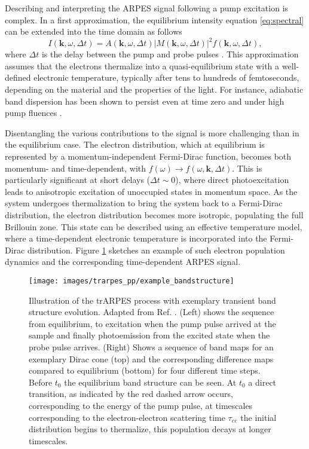 Describing and interpreting the ARPES signal following a pump excitation is complex.
In a first approximation, the equilibrium intensity equation \ref{eq:spectral} can be extended into the time domain as follows
\begin{equation}
	I(\mathbf{k}, \omega, \Delta t) = A(\mathbf{k}, \omega, \Delta t)\left|M(\mathbf{k}, \omega, \Delta t)\right|^2f(\mathbf{k}, \omega, \Delta t),
\end{equation}
where $\Delta t$ is the delay between the pump and probe pulses \cite{freericks_what_2021}.
This approximation assumes that the electrons thermalize into a quasi-equilibrium state with a well-defined electronic temperature, typically after tens to hundreds of femtoseconds, depending on the material and the properties of the light.
For instance, adiabatic band dispersion has been shown to persist even at time zero and under high pump fluences \cite{boschini_time-resolved_2024,neufeld_time-_2022}.

Disentangling the various contributions to the signal is more challenging than in the equilibrium case.
The electron distribution, which at equilibrium is represented by a momentum-independent Fermi-Dirac function, becomes both momentum- and time-dependent, with $f(\omega) \rightarrow f(\omega, \mathbf{k}, \Delta t)$.
This is particularly significant at short delays ($\Delta t \sim 0$), where direct photoexcitation leads to anisotropic excitation of unoccupied states in momentum space.
As the system undergoes thermalization to bring the system back to a Fermi-Dirac distribution, the electron distribution becomes more isotropic, populating the full Brillouin zone.
This state can be described using an effective temperature model, where a time-dependent electronic temperature is incorporated into the Fermi-Dirac distribution.
Figure \ref{fig:example_bandstructure} sketches an example of such electron population dynamics and the corresponding time-dependent ARPES signal.

\begin{figure}
	\centering
	\texttt{[image: images/trarpes\_pp/example\_bandstructure]}
	\caption{Illustration of the trARPES process with exemplary transient band structure evolution. Adapted from Ref. \cite{boschini_time-resolved_2024}. (Left) shows the sequence from equilibrium, to excitation when the pump pulse arrived at the sample and finally photoemission from the excited state when the probe pulse arrives. (Right) Shows a sequence of band maps for an exemplary Dirac cone (top) and the corresponding difference maps compared to equilibrium (bottom) for four different time steps. Before $t_0$ the equilibrium band structure can be seen. At $t_0$ a direct transition, as indicated by the red dashed arrow occurs, corresponding to the energy of the pump pulse, at timescales corresponding to the electron-electron scattering time $\tau_{ee}$ the initial distribution begins to thermalize, this population decays at longer timescales.}
	\label{fig:example_bandstructure}
\end{figure}

